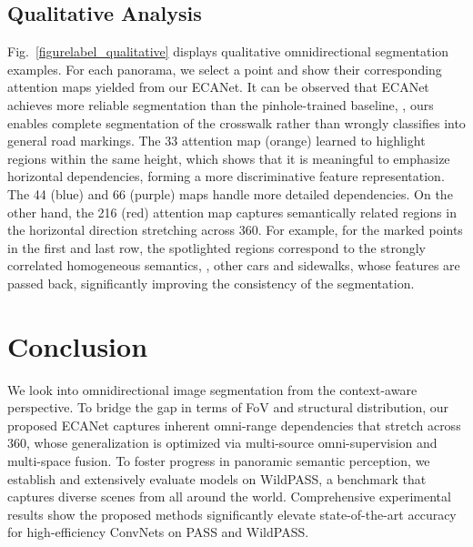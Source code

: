 \documentclass[final]{cvpr}
\begin{document}
\subsection{Qualitative Analysis}
\label{sec:qualitative}
Fig.~\ref{figurelabel_qualitative} displays qualitative omnidirectional segmentation examples.
For each panorama, we select a point and show their corresponding attention maps yielded from our ECANet.
It can be observed that ECANet achieves more reliable segmentation than the pinhole-trained baseline, \eg, ours enables complete segmentation of the crosswalk rather than wrongly classifies into general road markings.
The 33 attention map (orange) learned to highlight regions within the same height, which shows that it is meaningful to emphasize horizontal dependencies, forming a more discriminative feature representation.
The 44 (blue) and 66 (purple) maps handle more detailed dependencies.
On the other hand, the 216 (red) attention map captures semantically related regions in the horizontal direction stretching across 360.
For example, for the marked points in the first and last row, the spotlighted regions correspond to the strongly correlated homogeneous semantics, \ie, other cars and sidewalks, whose features are passed back, significantly improving the consistency of the segmentation.

\section{Conclusion}
We look into omnidirectional image segmentation from the context-aware perspective.
To bridge the gap in terms of FoV and structural distribution, our proposed ECANet captures inherent omni-range dependencies that stretch across 360, whose generalization is optimized via multi-source omni-supervision and multi-space fusion.
To foster progress in panoramic semantic perception, we establish and extensively evaluate models on WildPASS, a benchmark that captures diverse scenes from all around the world.
Comprehensive experimental results show the proposed methods significantly elevate state-of-the-art accuracy for high-efficiency ConvNets on PASS and WildPASS.

\clearpage



{\small


}
\end{document}
